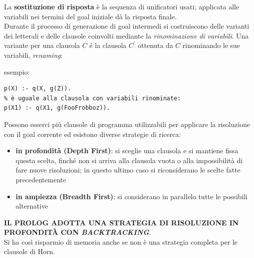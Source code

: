 \documentclass[a4paper,12pt, oneside]{book}
\begin{document}
La \textbf{sostituzione di risposta} è la sequenza di unificatori usati; applicata alle variabili nei termini del goal iniziale dà la risposta finale.\\
Durante il processo di generazione di goal intermedi si costruiscono delle varianti dei letterali e delle clausole coinvolti mediante la\textit{ rinominazione di variabili}. Una variante per una clausola $C$ é la clausola $C^{'}$ ottenuta da $C$ rinominando le sue variabili, \textit{renaming}:
\begin{esempio}
esempio:
\begin{verbatim}
p(X) :- q(X, g(Z)).
% è uguale alla clausola con variabili rinominate:
p(X1) :- q(X1, g(FooFrobboz)).
\end{verbatim}
\end{esempio}
Possono esserci più clausole di programma utilizzabili per applicare la risoluzione con il goal corrente ed esistono diverse strategie di ricerca:
\begin{itemize}
\item \textbf{in profondità (Depth First)}: si sceglie una clausola e si mantiene fissa questa scelta, finché non si arriva alla clausola vuota o alla impossibilità di fare nuove risoluzioni; in questo ultimo caso si riconsiderano le scelte fatte precedentemente
\item \textbf{in ampiezza (Breadth First)}: si considerano in parallelo tutte le possibili alternative
\end{itemize}
\textbf{IL PROLOG ADOTTA UNA STRATEGIA DI RISOLUZIONE IN PROFONDITÀ CON \textit{BACKTRACKING}}.\\
Si ha così risparmio di memoria anche se non è una strategia completa per le clausole di Horn.\\
\end{document}
